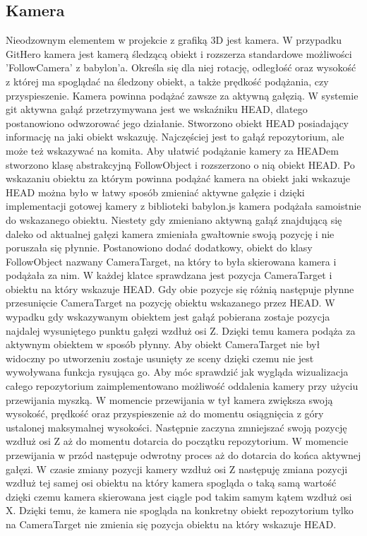 \documentclass[12pt,a4paper,polish,thesis]{dcsbook}
\begin{document}
{	\subsection{Kamera} \label{camera}

	Nieodzownym elementem w projekcie z grafiką 3D jest kamera. W przypadku GitHero kamera jest kamerą śledzącą obiekt i rozszerza standardowe możliwości 'FollowCamera' z babylon'a. Określa się dla niej rotację, odległość oraz wysokość z której ma spoglądać na śledzony obiekt, a także prędkość podążania, czy przyspieszenie. Kamera powinna podążać zawsze za aktywną gałęzią. W systemie git aktywna gałąź przetrzymywana jest we wskaźniku HEAD, dlatego postanowiono odwzorować jego działanie. Stworzono obiekt HEAD posiadający informację na jaki obiekt wskazuję. Najczęściej jest to gałąź repozytorium, ale może też wskazywać na komita. Aby ułatwić podążanie kamery za HEADem stworzono klasę abstrakcyjną FollowObject i rozszerzono o nią obiekt HEAD. Po wskazaniu obiektu za którym powinna podążać kamera na obiekt jaki wskazuje HEAD można było w łatwy sposób zmieniać aktywne gałęzie i dzięki implementacji gotowej kamery z biblioteki babylon.js kamera podążała samoistnie do wskazanego obiektu. Niestety gdy zmieniano aktywną gałąź znajdującą się daleko od aktualnej gałęzi kamera zmieniała gwałtownie swoją pozycję i nie poruszała się płynnie. Postanowiono dodać dodatkowy, obiekt do klasy FollowObject nazwany CameraTarget, na który to była skierowana kamera i podążała za nim. W każdej klatce sprawdzana jest pozycja CameraTarget i obiektu na który wskazuje HEAD. Gdy obie pozycje się różnią następuje płynne przesunięcie CameraTarget na pozycję obiektu wskazanego przez HEAD. W wypadku gdy wskazywanym obiektem jest gałąź pobierana zostaje pozycja najdalej wysuniętego punktu gałęzi wzdłuż osi Z. Dzięki temu kamera podąża za aktywnym obiektem w sposób płynny. Aby obiekt CameraTarget nie był widoczny po utworzeniu zostaje usunięty ze sceny dzięki czemu nie jest wywoływana funkcja rysująca go. Aby móc sprawdzić jak wygląda wizualizacja całego repozytorium zaimplementowano możliwość oddalenia kamery przy użyciu przewijania myszką. W momencie przewijania w tył kamera zwiększa swoją wysokość, prędkość oraz przyspieszenie aż do momentu osiągnięcia z góry ustalonej maksymalnej wysokości. Następnie zaczyna zmniejszać swoją pozycję wzdłuż osi Z aż do momentu dotarcia do początku repozytorium. W momencie przewijania w przód następuje odwrotny proces aż do dotarcia do końca aktywnej gałęzi. W czasie zmiany pozycji kamery wzdłuż osi Z następuję zmiana pozycji wzdłuż tej samej osi obiektu na który kamera spogląda o taką samą wartość dzięki czemu kamera skierowana jest ciągle pod takim samym kątem wzdłuż osi X. Dzięki temu, że kamera nie spogląda na konkretny obiekt repozytorium tylko na CameraTarget nie zmienia się pozycja obiektu na który wskazuje HEAD.

}
\end{document}
